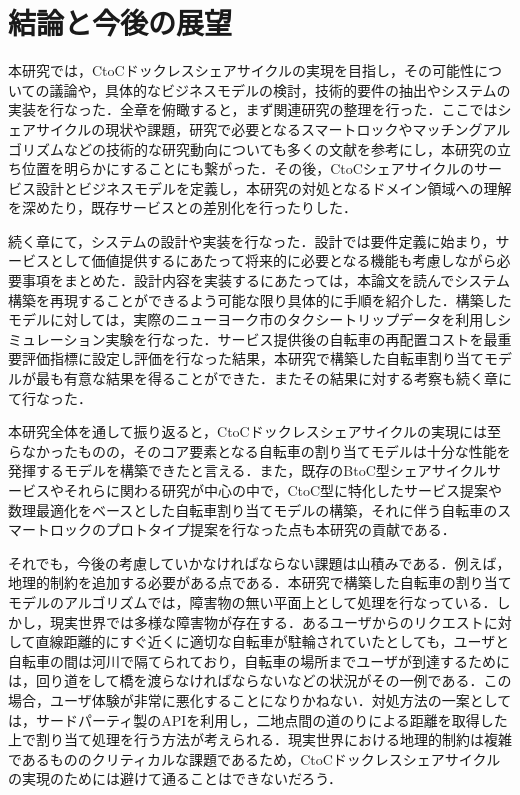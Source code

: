 \section{結論と今後の展望}
  \label{sec:結論と今後の展望}  
    \par 本研究では，CtoCドックレスシェアサイクルの実現を目指し，その可能性についての議論や，具体的なビジネスモデルの検討，技術的要件の抽出やシステムの実装を行なった．全章を俯瞰すると，まず関連研究の整理を行った．ここではシェアサイクルの現状や課題，研究で必要となるスマートロックやマッチングアルゴリズムなどの技術的な研究動向についても多くの文献を参考にし，本研究の立ち位置を明らかにすることにも繋がった．その後，CtoCシェアサイクルのサービス設計とビジネスモデルを定義し，本研究の対処となるドメイン領域への理解を深めたり，既存サービスとの差別化を行ったりした．
    \par 続く章にて，システムの設計や実装を行なった．設計では要件定義に始まり，サービスとして価値提供するにあたって将来的に必要となる機能も考慮しながら必要事項をまとめた．設計内容を実装するにあたっては，本論文を読んでシステム構築を再現することができるよう可能な限り具体的に手順を紹介した．構築したモデルに対しては，実際のニューヨーク市のタクシートリップデータを利用しシミュレーション実験を行なった．サービス提供後の自転車の再配置コストを最重要評価指標に設定し評価を行なった結果，本研究で構築した自転車割り当てモデルが最も有意な結果を得ることができた．またその結果に対する考察も続く章にて行なった．
    \par 本研究全体を通して振り返ると，CtoCドックレスシェアサイクルの実現には至らなかったものの，そのコア要素となる自転車の割り当てモデルは十分な性能を発揮するモデルを構築できたと言える．また，既存のBtoC型シェアサイクルサービスやそれらに関わる研究が中心の中で，CtoC型に特化したサービス提案や数理最適化をベースとした自転車割り当てモデルの構築，それに伴う自転車のスマートロックのプロトタイプ提案を行なった点も本研究の貢献である．
    \par それでも，今後の考慮していかなければならない課題は山積みである．例えば，地理的制約を追加する必要がある点である．本研究で構築した自転車の割り当てモデルのアルゴリズムでは，障害物の無い平面上として処理を行なっている．しかし，現実世界では多様な障害物が存在する．あるユーザからのリクエストに対して直線距離的にすぐ近くに適切な自転車が駐輪されていたとしても，ユーザと自転車の間は河川で隔てられており，自転車の場所までユーザが到達するためには，回り道をして橋を渡らなければならないなどの状況がその一例である．この場合，ユーザ体験が非常に悪化することになりかねない．対処方法の一案としては，サードパーティ製のAPIを利用し，二地点間の道のりによる距離を取得した上で割り当て処理を行う方法が考えられる．現実世界における地理的制約は複雑であるもののクリティカルな課題であるため，CtoCドックレスシェアサイクルの実現のためには避けて通ることはできないだろう．
